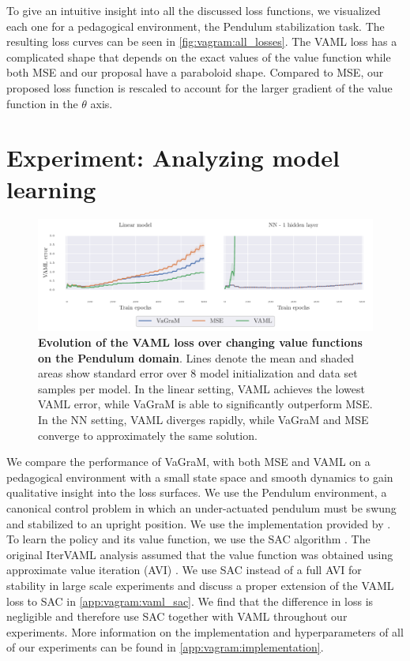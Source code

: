 To give an intuitive insight into all the discussed loss functions, we visualized each one for a pedagogical environment, the Pendulum stabilization task.
The resulting loss curves can be seen in \autoref{fig:vagram:all_losses}.
The VAML loss has a complicated shape that depends on the exact values of the value function while both MSE and our proposal have a paraboloid shape.
Compared to MSE, our proposed loss function is rescaled to account for the larger gradient of the value function in the $\theta$ axis.

\section{Experiment: Analyzing model learning}
\label{sec:vagram:experiments}

\begin{figure}[t]
\begin{center}
\includegraphics[width=\linewidth]{figures/vagram/pendulum_joint.pdf}
\end{center}
\caption{\textbf{Evolution of the VAML loss over changing value functions on the Pendulum domain}. Lines denote the mean and shaded areas show standard error over 8 model initialization and data set samples per model. In the linear setting, VAML achieves the lowest VAML error, while VaGraM is able to significantly outperform MSE. In the NN setting, VAML diverges rapidly, {while VaGraM and MSE converge to approximately the same solution.}}
\label{fig:vagram:iterated_pendulum_training}
\end{figure}

We compare the performance of VaGraM, with both MSE and VAML on a pedagogical environment with a small state space and smooth dynamics to gain qualitative insight into the loss surfaces. 
We use the Pendulum environment, a canonical control problem in which an under-actuated pendulum must be swung and stabilized to an upright position.
We use the implementation provided by \textcite{brockman2016openai}.
To learn the policy and its value function, we use the SAC algorithm \parencite{sac}.
The original IterVAML analysis assumed that the value function was obtained using approximate value iteration (AVI) \parencite{gordon1995stable,ernst2005tree,farahmand2010error}. We use SAC instead of a full AVI for stability in large scale experiments and discuss a proper extension of the VAML loss to SAC in \autoref{app:vagram:vaml_sac}. We find that the difference in loss is negligible and therefore use SAC together with VAML throughout our experiments.
More information on the implementation and hyperparameters of all of our experiments can be found in \autoref{app:vagram:implementation}. 

